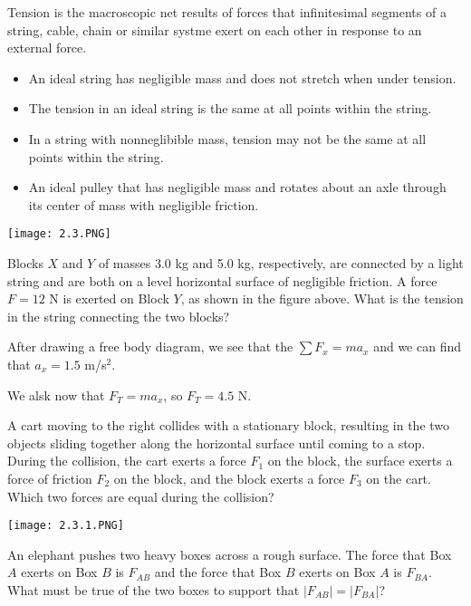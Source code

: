 \documentclass[../mech.tex]{subfiles}
\begin{document}
Tension is the macroscopic net results of forces that infinitesimal segments of a string, cable, chain or similar systme exert on each other in response to an external force.
\begin{itemize}
    \item An ideal string has negligible mass and does not stretch when under tension.
    \item The tension in an ideal string is the same at all points within the string.
    \item In a string with nonneglibible mass, tension may not be the same at all points within the string.
    \item An ideal pulley that has negligible mass and rotates about an axle through its center of mass with negligible friction.
\end{itemize}

\begin{example}
    \begin{center}
        \texttt{[image: 2.3.PNG]}
    \end{center}
    Blocks $X$ and $Y$ of masses 3.0 kg and 5.0 kg, respectively, are connected by a light string and are both on a level horizontal surface of negligible friction. A force $F=12$ N is exerted on Block $Y$, as shown in the figure above. What is the tension in the string connecting the two blocks?

    After drawing a free body diagram, we see that the $\sum F_x = ma_x$ and we can find that $a_x=1.5$ m/s$^2$.

    We alsk now that $F_T = ma_x$, so $F_T = 4.5$ N.
\end{example}

\ex A cart moving to the right collides with a stationary block, resulting in the two objects sliding together along the horizontal surface until coming to a stop.
During the collision, the cart exerts a force $F_1$ on the block, the surface exerts a force of friction $F_2$ on the block, and the block exerts a force $F_3$ on the cart. Which two forces are equal during the collision?

\ex \begin{center}
    \texttt{[image: 2.3.1.PNG]}
\end{center}
An elephant pushes two heavy boxes across a rough surface. The force that Box $A$ exerts on Box $B$ is $F_{AB}$ and the force that Box $B$ exerts on Box $A$ is $F_{BA}$. What must be true of the two boxes to support that $|F_{AB}|=|F_{BA}|$?
\end{document}
